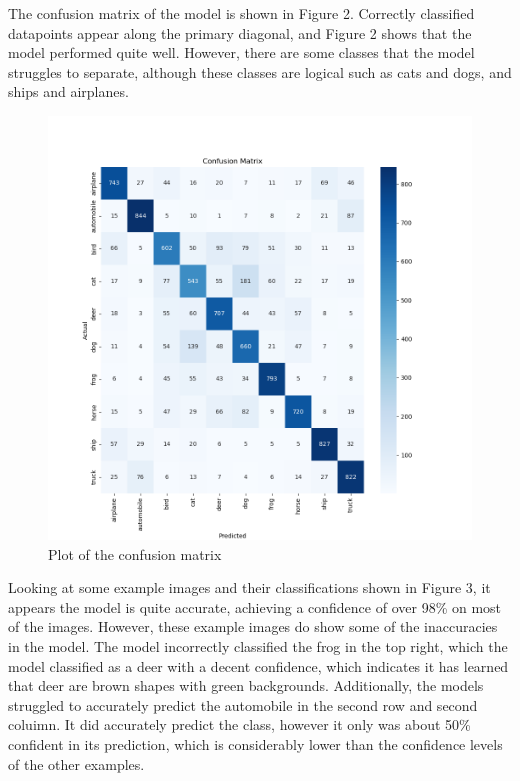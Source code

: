 \documentclass[letterpaper, 12pt]{article}
\begin{document}
The confusion matrix of the model is shown in Figure 2. Correctly classified datapoints appear along the primary diagonal, and Figure 2 shows that the model performed quite well. However, there are some classes that the model struggles to separate, although these classes are logical such as cats and dogs, and ships and airplanes.

\begin{figure}[H]
\centering
\includegraphics[scale = 0.5]{confusion_matrix}
\caption{Plot of the confusion matrix}
\end{figure}

Looking at some example images and their classifications shown in Figure 3, it appears the model is quite accurate, achieving a confidence of over 98\% on most of the images. However, these example images do show some of the inaccuracies in the model. The model incorrectly classified the frog in the top right, which the model classified as a deer with a decent confidence, which indicates it has learned that deer are brown shapes with green backgrounds. Additionally, the models struggled to accurately predict the automobile in the second row and second coluimn.  It did accurately predict the class, however it only was about 50\% confident in its prediction, which is considerably lower than the confidence levels of the other examples.
\end{document}
